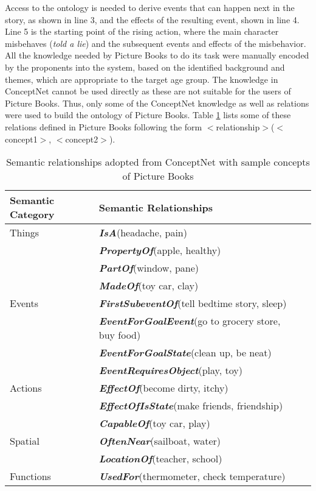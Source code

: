 Access to the ontology is needed to derive events that can happen next in the story, as shown in line 3, and the effects of the resulting event, shown in line 4. Line 5 is the starting point of the rising action, where the main character misbehaves (\emph{told a lie}) and the subsequent events and effects of the misbehavior. All the knowledge needed by Picture Books to do its task were manually encoded by the proponents into the system, based on the identified background and themes, which are appropriate to the target age group. The knowledge in ConceptNet cannot be used directly as these are not suitable for the users of Picture Books. Thus, only some of the ConceptNet knowledge as well as relations were used to build the ontology of Picture Books. Table \ref{tab:semanticrelationships} lists some of these relations defined in Picture Books following the form $<$relationship$>$($<$concept1$>$, $<$concept2$>$). 

\begin{table}[ht]   %
\centering
\caption{Semantic relationships adopted from ConceptNet \protect \cite{Liu:2004b} with sample concepts of Picture Books} \vspace{0.25em}
\begin{tabular}{|l|l|l|} \hline
Semantic Category & Semantic Relationships \\ \hline
Things       & \textbf{\emph{IsA}}(headache, pain)  \\ 
 			 & \textbf{\emph{PropertyOf}}(apple, healthy) \\ 
 			 & \textbf{\emph{PartOf}}(window, pane) \\
 			 & \textbf{\emph{MadeOf}}(toy car, clay) \\ \hline
Events		 & \textbf{\emph{FirstSubeventOf}}(tell bedtime story, sleep) \\
			 & \textbf{\emph{EventForGoalEvent}}(go to grocery store, buy food) \\
			 & \textbf{\emph{EventForGoalState}}(clean up, be neat) \\
			 & \textbf{\emph{EventRequiresObject}}(play, toy) \\ \hline
Actions		 & \textbf{\emph{EffectOf}}(become dirty, itchy) \\
			 & \textbf{\emph{EffectOfIsState}}(make friends, friendship) \\
			 & \textbf{\emph{CapableOf}}(toy car, play) \\ \hline
Spatial		 & \textbf{\emph{OftenNear}}(sailboat, water) \\
			 & \textbf{\emph{LocationOf}}(teacher, school) \\ \hline
Functions	 & \textbf{\emph{UsedFor}}(thermometer, check temperature) \\ \hline
\end{tabular}
\label{tab:semanticrelationships}
\end{table}

